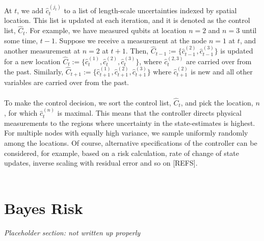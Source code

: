 At $t$, we add $\hat{c}_t^{(j_t)}$ to a list of length-scale uncertainties indexed by spatial location. This list is updated at each iteration, and it is denoted as the control list,  $\hat{C}_t$. For example, we have measured qubits at location $n=2$  and $n=3$ until some time, $t-1$.  Suppose we receive a measurement at the node $n=1$ at $t$, and another measurement at $n=2$ at $t+1$. Then, $\hat{C}_{t-1}:= \{\hat{c}_{t-1}^{(2)}, \hat{c}_{t-1}^{(3)}\}$ is updated for a new location $\hat{C}_{t}:= \{\hat{c}_{t}^{(1)}, \hat{c}_{t}^{(2)}, \hat{c}_{t}^{(3)}\}$, where $\hat{c}_{t}^{(2,3)}$ are carried over from the past. Similarly, $\hat{C}_{t+1}:= \{\hat{c}_{t+1}^{(1)}, \hat{c}_{t+1}^{(2)}, \hat{c}_{t+1}^{(3)}\}$ where $\hat{c}_{t+1}^{(2)}$ is new and all other variables are carried over from the past. \\
\\
To make the control decision, we sort the control list,  $\hat{C}_t$, and pick the location, $n$, for which $\hat{c}_{t}^{(n)}$ is maximal. This means that the controller directs physical measurements to the regions where uncertainty in the state-estimates is highest. For multiple nodes with equally high variance, we sample uniformly randomly among the locations. Of course, alternative specifications of the controller can be considered, for example, based on a risk calculation, rate of change of state updates, inverse scaling with residual error and so on [REFS].\\
\\
\section{Bayes Risk} \label{sec:risk}

\textit{Placeholder section: not written up properly} \\

